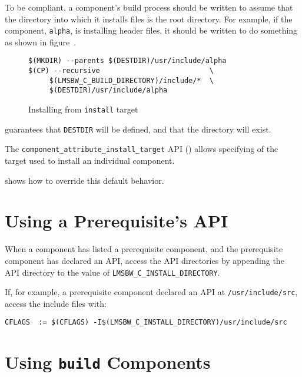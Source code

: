 \begin{itemize}
  To be compliant, a component's build process should be written to
  assume that the directory into which it installs files is the root
  directory.  For example, if the component, \texttt{alpha}, is
  installing header files, it should be written to do something as
  shown in figure~.

\begin{figure}
\hrulefill
\begin{verbatim}
$(MKDIR) --parents $(DESTDIR)/usr/include/alpha
$(CP) --recursive                          \
     $(LMSBW_C_BUILD_DIRECTORY)/include/*  \
     $(DESTDIR)/usr/include/alpha
\end{verbatim}
\hrulefill
\caption{Installing from \texttt{install} target}\label{wrap:install-target}
\end{figure}

  \lmsbw guarantees that \texttt{DESTDIR} will be defined, and that
  the directory will exist.

  The \texttt{component\_attribute\_install\_target} API
  () allows specifying of
  the target used to install an individual component.

   shows how to override this
  default behavior.

\end{itemize}

\section{Using a Prerequisite's API}\label{wrap:using-prerequisite-api}

When a component has listed a prerequisite component, and the
prerequisite component has declared an API, access the API directories
by appending the API directory to the value of
\texttt{LMSBW\_C\_INSTALL\_DIRECTORY}.

If, for example, a prerequisite component declared an API at
\texttt{/usr/include/src}, access the include files with:

\begin{footnotesize}
\begin{verbatim}
CFLAGS  := $(CFLAGS) -I$(LMSBW_C_INSTALL_DIRECTORY)/usr/include/src
\end{verbatim}
\end{footnotesize}

\section{Using \texttt{build} Components}\label{wrap:using-build-components}

